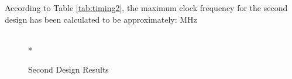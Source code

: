 According to Table \ref{tab:timing2}, the maximum clock frequency for the second design has been calculated to be approximately:  MHz


\begin{figure}[htp]
  \begin{center}
     \\*
  \end{center}
  \caption{Second Design Results}
  \label{fig:design2_results}
\end{figure}
